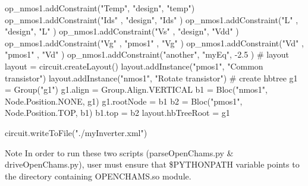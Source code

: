 \begin{DoxyCodeInclude}
op\_nmos1.addConstraint(\textcolor{stringliteral}{"Temp"}, \textcolor{stringliteral}{"design"}, \textcolor{stringliteral}{"temp"})
op\_nmos1.addConstraint(\textcolor{stringliteral}{"Ids"} , \textcolor{stringliteral}{"design"}, \textcolor{stringliteral}{"Ids"} )
op\_nmos1.addConstraint(\textcolor{stringliteral}{"L"}   , \textcolor{stringliteral}{"design"}, \textcolor{stringliteral}{"L"}   )
op\_nmos1.addConstraint(\textcolor{stringliteral}{"Vs"}  , \textcolor{stringliteral}{"design"}, \textcolor{stringliteral}{"Vdd"} )
op\_nmos1.addConstraint(\textcolor{stringliteral}{"Vg"}  , \textcolor{stringliteral}{"pmos1"} , \textcolor{stringliteral}{"Vg"}  )
op\_nmos1.addConstraint(\textcolor{stringliteral}{"Vd"}  , \textcolor{stringliteral}{"pmos1"} , \textcolor{stringliteral}{"Vd"}  )
op\_nmos1.addConstraint(\textcolor{stringliteral}{"another"}, \textcolor{stringliteral}{"myEq"}, -2.5 )
\textcolor{comment}{# layout}
layout = circuit.createLayout()
layout.addInstance(\textcolor{stringliteral}{"pmos1"}, \textcolor{stringliteral}{"Common transistor"})
layout.addInstance(\textcolor{stringliteral}{"nmos1"}, \textcolor{stringliteral}{"Rotate transistor"})
\textcolor{comment}{# create hbtree}
g1 = Group(\textcolor{stringliteral}{"g1"})
g1.align = Group.Align.VERTICAL
b1 = Bloc(\textcolor{stringliteral}{"nmos1"}, Node.Position.NONE, g1)
g1.rootNode = b1 
b2 = Bloc(\textcolor{stringliteral}{"pmos1"}, Node.Position.TOP, b1)
b1.top = b2
layout.hbTreeRoot = g1

circuit.writeToFile(\textcolor{stringliteral}{"./myInverter.xml"})
\end{DoxyCodeInclude}


\begin{DoxyNote}{Note}
In order to run these two scripts ({\ttfamily parse\+Open\+Chams.\+py} \& drive\+Open\+Chams.\+py), user must ensure that \$\+P\+Y\+T\+H\+O\+N\+P\+A\+TH variable points to the directory containing O\+P\+E\+N\+C\+H\+A\+M\+S.\+so module. 
\end{DoxyNote}

